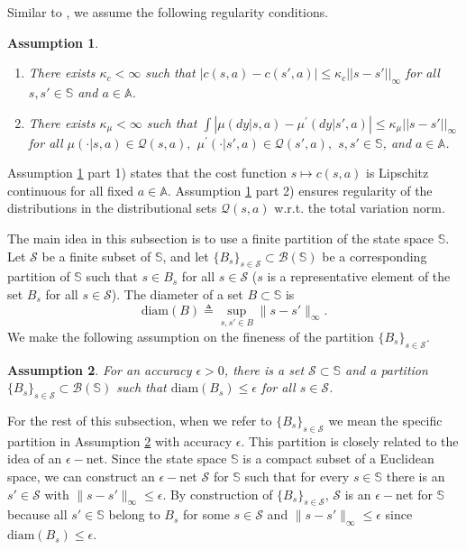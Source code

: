 \documentclass[12pt,technote,onecolumn]{IEEEtran}
\newtheorem{assumption}{Assumption}
\begin{document}
Similar to \cite{rust1997using}, we assume the following regularity conditions.
\begin{assumption}
	\label{assu:Epsilon_net_regularity} 
	\begin{enumerate}
		\item There exists $\kappa_{c}<\infty$ such that $|c(s,a)-c(s',a)|\leq\kappa_{c}||s-s'||_\infty$
		for all $s,s'\in\mathbb{S}$ and $a\in\mathbb{A}$.
		\item There exists $\kappa_{\mu}<\infty$ such that $\int|\mu(dy\vert s,a)-\mu^{'}(dy\vert s',a)|\leq\kappa_{\mu}||s-s'||_\infty$
		for all $\mu(\cdot\vert s,a)\in\mathcal{Q}(s,a),$
		$\mu^{'}(\cdot\vert s',a)\in\mathcal{Q}(s',a),$
		$s,s'\in\mathbb{S}$, and $a\in\mathbb{A}$.
	\end{enumerate}	
\end{assumption}

Assumption \ref{assu:Epsilon_net_regularity} part 1) states that the
cost function $s\mapsto c(s,a)$ is Lipschitz continuous
for all fixed $a\in\mathbb{A}$. Assumption \ref{assu:Epsilon_net_regularity} part
2) ensures regularity of the distributions in the distributional
sets $\mathcal{Q}\left(s,a\right)$ w.r.t. the total variation norm.

The main idea in this subsection is to use a finite partition of the
state space $\mathbb{S}$. Let $\mathcal{S}$ be a finite subset of
$\mathbb{S}$, and let $\{ B_{s}\} _{s\in\mathcal{S}}\subset\mathcal{B}\left(\mathbb{S}\right)$
be a corresponding partition of $\mathbb{S}$ such that $s\in B_{s}$
for all $s\in\mathcal{S}$ ($s$ is a representative element of the
set $B_{s}$ for all $s\in\mathcal{S}$). The diameter of a set $B\subset\mathbb{S}$
is
$$
\mbox{diam}\left(B\right)\triangleq\sup_{s,s'\in B}\|s-s'\|_{\infty}.
$$
We make the following assumption on the fineness of the partition
$\{ B_{s}\} _{s\in\mathcal{S}}$.
\begin{assumption}
	\label{assu:Epsilon_net_partition} For an accuracy $\epsilon>0$,
	there is a set $\mathcal{S}\subset\mathbb{S}$ and a partition $\{ B_{s}\} _{s\in\mathcal{S}}\subset\mathcal{B}\left(\mathbb{S}\right)$
	such that $\mbox{diam}(B_{s})\leq\epsilon$ for all
	$s\in\mathcal{S}$.
\end{assumption}

For the rest of this subsection, when we refer to $\{ B_{s}\} _{s\in\mathcal{S}}$
we mean the specific partition in Assumption \ref{assu:Epsilon_net_partition}
with accuracy $\epsilon$. This partition is closely related to
the idea of an $\epsilon-$net. Since the state space $\mathbb{S}$ is a compact subset of a Euclidean space, we can construct an $\epsilon-$net $\mathcal{S}$ for $\mathbb{S}$
such that for every $s\in\mathbb{S}$ there is an $s'\in\mathcal{S}$ with
$\|s-s'\|_{\infty}\leq\epsilon$. By construction of $\{ B_{s}\} _{s\in\mathcal{S}}$,
$\mathcal{S}$ is an $\epsilon-$net for $\mathbb{S}$ because all
$s'\in\mathbb{S}$ belong to $B_{s}$ for some $s\in\mathcal{S}$
and $\|s-s'\|_{\infty}\leq\epsilon$ since $\mbox{diam}\left(B_{s}\right)\leq\epsilon$.
\end{document}
